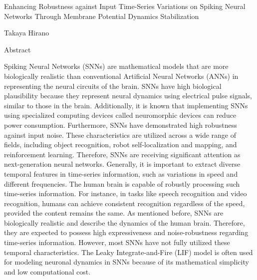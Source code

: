 \pagestyle{empty}

\begin{center}
    Enhancing Robustness against Input Time-Series Variations on Spiking Neural Networks Through Membrane Potential Dynamics Stabilization
\end{center}
\vspace{10mm}
\begin{center}
    Takaya Hirano
\end{center}
\vspace{10mm}

\begin{center}
    Abstract
\end{center}
\vspace{10mm}

Spiking Neural Networks (SNNs) are mathematical models that are more biologically realistic than conventional Artificial Neural Networks (ANNs) in representing the neural circuits of the brain.
SNNs have high biological plausibility because they represent neural dynamics using electrical pulse signals, similar to those in the brain.
Additionally, it is known that implementing SNNs using specialized computing devices called neuromorphic devices can reduce power consumption. 
Furthermore, SNNs have demonstrated high robustness against input noise.
These characteristics are utilized across a wide range of fields, including object recognition, robot self-localization and mapping, and reinforcement learning.
Therefore, SNNs are receiving significant attention as next-generation neural networks.
Generally, it is important to extract diverse temporal features in time-series information, such as variations in speed and different frequencies. 
The human brain is capable of robustly processing such time-series information.
For instance, in tasks like speech recognition and video recognition, humans can achieve consistent recognition regardless of the speed, provided the content remains the same.
As mentioned before, SNNs are biologically realistic and describe the dynamics of the human brain.
Therefore, they are expected to possess high expressiveness and noise-robustness regarding time-series information.
However, most SNNs have not fully utilized these temporal characteristics. 
The Leaky Integrate-and-Fire (LIF) model is often used for modeling neuronal dynamics in SNNs because of its mathematical simplicity and low computational cost. 
